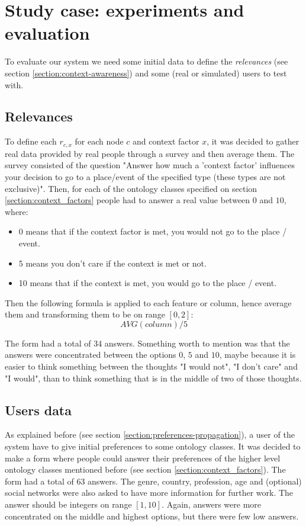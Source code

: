 \section{Study case: experiments and evaluation}
To evaluate our system we need some initial data to define the \textit{relevances} (see section \ref{section:context-awareness}) and some (real or simulated) users to test with.

\subsection{Relevances}
To define each $r_{c,x}$ for each node $c$ and context factor $x$, it was decided to gather real data provided by real people through a survey and then average them. The survey consisted of the question "Answer how much a 'context factor' influences your decision to go to a place/event of the specified type (these types are not exclusive)". Then, for each of the ontology classes specified on section \ref{section:context_factors} people had to answer a real value between $0$ and $10$, where:
\begin{itemize}
    \item $0$ means that if the context factor is met, you would not go to the place / event.
    \item 5 means you don't care if the context is met or not.
    \item 10 means that if the context is met, you would go to the place / event.
\end{itemize}

Then the following formula is applied to each feature or column, hence average them and transforming them to be on range $[0,2]$:
$$AVG(column)/5$$

The form had a total of 34 answers. Something worth to mention was that the answers were concentrated between the options $0$, $5$ and $10$, maybe because it is easier to think something between the thoughts "I would not", "I don't care" and "I would", than to think something that is in the middle of two of those thoughts.

\subsection{Users data}
As explained before (see section \ref{section:preferences-propagation}), a user of the system have to give initial preferences to some ontology classes. It was decided to make a form where people could answer their preferences of the higher level ontology classes mentioned before (see section \ref{section:context_factors}). The form had a total of 63 answers. The genre, country, profession, age and (optional) social networks were also asked to have more information for further work. The answer should be integers on range $[1, 10]$. Again, answers were more concentrated on the middle and highest options, but there were few low answers.

